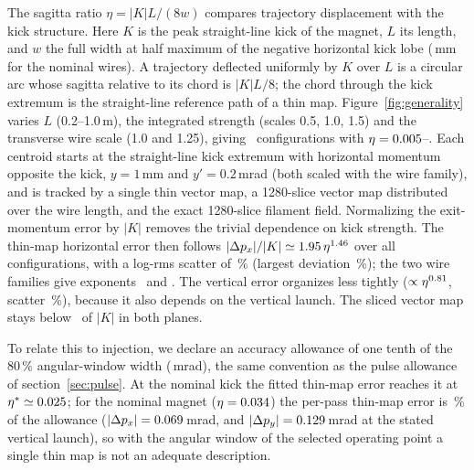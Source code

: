 \documentclass[aps,prab,reprint,amsmath,amssymb,floatfix,longbibliography]{revtex4-2}
\begin{document}
The sagitta ratio $\eta=|K|L/(8w)$ compares trajectory displacement with the kick structure. Here $K$ is the peak straight-line kick of the magnet, $L$ its length, and $w$ the full width at half maximum of the negative horizontal kick lobe (\GenNomW\,mm for the nominal wires). A trajectory deflected uniformly by $K$ over $L$ is a circular arc whose sagitta relative to its chord is $|K|L/8$; the chord through the kick extremum is the straight-line reference path of a thin map. Figure~\ref{fig:generality} varies $L$ (0.2--1.0\,m), the integrated strength (scales 0.5, 1.0, 1.5) and the transverse wire scale (1.0 and 1.25), giving \GenConfigs\ configurations with $\eta=0.005$--\GenEtaMax. Each centroid starts at the straight-line kick extremum with horizontal momentum opposite the kick, $y=1$\,mm and $y'=0.2$\,mrad (both scaled with the wire family), and is tracked by a single thin vector map, a 1280-slice vector map distributed over the wire length, and the exact 1280-slice filament field. Normalizing the exit-momentum error by $|K|$ removes the trivial dependence on kick strength. The thin-map horizontal error then follows $|\Delta p_x|/|K|\simeq1.95\,\eta^{1.46}$ over all configurations, with a log-rms scatter of \GenScatterX\,\% (largest deviation \GenScatterMaxX\,\%); the two wire families give exponents \GenExpFamilyOne\ and \GenExpFamilyTwo. The vertical error organizes less tightly ($\propto\eta^{0.81}$, scatter \GenScatterY\,\%), because it also depends on the vertical launch. The sliced vector map stays below \GenSlicedMax\ of $|K|$ in both planes.

To relate this to injection, we declare an accuracy allowance of one tenth of the 80\,\% angular-window width (\GenAllowMrad\,mrad), the same convention as the pulse allowance of section~\ref{sec:pulse}. At the nominal kick the fitted thin-map error reaches it at $\eta^*\simeq0.025$; for the nominal magnet ($\eta=0.034$) the per-pass thin-map error is \GenAllowFraction\,\% of the allowance ($|\Delta p_x|=0.069$\,mrad, and $|\Delta p_y|=0.129$\,mrad at the stated vertical launch), so with the angular window of the selected operating point a single thin map is not an adequate description.
\end{document}
